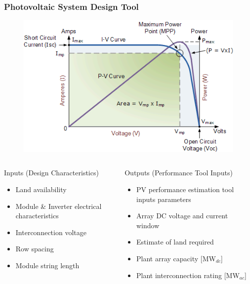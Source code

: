 \documentclass[aspectratio=169]{beamer}
\begin{document}
\begin{frame}
  \frametitle{Photovoltaic System Design Tool}
  \begin{figure}
    \includegraphics[width=0.25\linewidth]{IV_Curve.png}
  \end{figure}
  \begin{columns}[t]
    \begin{block}{Inputs (Design Characteristics)}
      \begin{itemize}
      \item Land availability
      \item Module \& Inverter electrical characteristics
      \item Interconnection voltage
      \item Row spacing
      \item Module string length
      \end{itemize}
    \end{block}

    \begin{block}{Outputs (Performance Tool Inputs)}
      \begin{itemize}
      \item PV performance estimation tool inputs parameters
      \item Array DC voltage and current window
      \item Estimate of land required
      \item Plant array capacity [MW$_{dc}$]
      \item Plant interconnection rating [MW$_{ac}$]
      \end{itemize}
    \end{block}
  \end{columns}
\end{frame}
\end{document}
